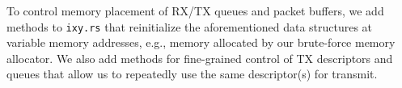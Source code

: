 To control memory placement of RX/TX queues and packet buffers, we add methods
to \texttt{ixy.rs} that reinitialize the aforementioned data structures at
variable memory addresses, e.g., memory allocated by our brute-force memory
allocator. We also add methods for fine-grained control of TX descriptors and
queues that allow us to repeatedly use the same descriptor(s) for transmit.

